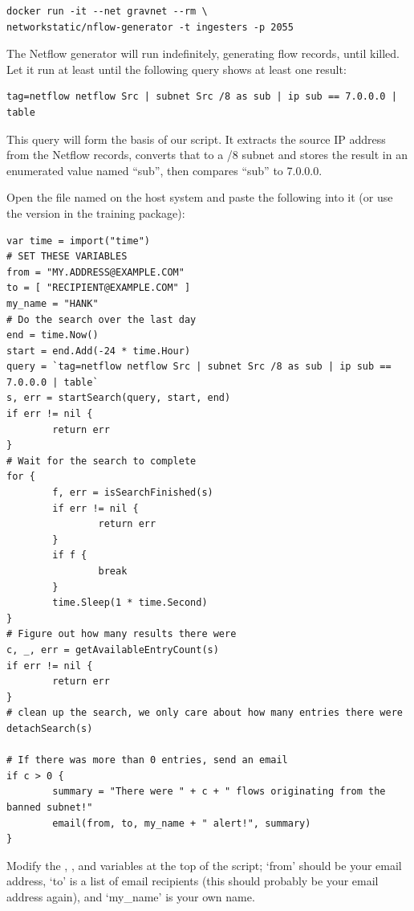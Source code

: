 \begin{Verbatim}[breaklines=true]
docker run -it --net gravnet --rm \
networkstatic/nflow-generator -t ingesters -p 2055
\end{Verbatim}

The Netflow generator will run indefinitely, generating flow records,
until killed. Let it run at least until the following query shows at
least one result:

\begin{Verbatim}[breaklines=true]
tag=netflow netflow Src | subnet Src /8 as sub | ip sub == 7.0.0.0 | table
\end{Verbatim}

This query will form the basis of our script. It extracts the source IP
address from the Netflow records, converts that to a /8 subnet and
stores the result in an enumerated value named ``sub'', then compares
``sub'' to 7.0.0.0.

Open the file named   on the host system and paste
the following into it (or use the version in the training package):

\begin{Verbatim}[breaklines=true]
var time = import("time")
# SET THESE VARIABLES
from = "MY.ADDRESS@EXAMPLE.COM"
to = [ "RECIPIENT@EXAMPLE.COM" ]
my_name = "HANK"
# Do the search over the last day
end = time.Now()
start = end.Add(-24 * time.Hour)
query = `tag=netflow netflow Src | subnet Src /8 as sub | ip sub == 7.0.0.0 | table`
s, err = startSearch(query, start, end)
if err != nil {
        return err
}
# Wait for the search to complete
for {
        f, err = isSearchFinished(s)
        if err != nil {
                return err
        }
        if f {
                break
        }
        time.Sleep(1 * time.Second)
}
# Figure out how many results there were
c, _, err = getAvailableEntryCount(s)
if err != nil {
        return err
}
# clean up the search, we only care about how many entries there were
detachSearch(s)

# If there was more than 0 entries, send an email
if c > 0 {
        summary = "There were " + c + " flows originating from the banned subnet!"
        email(from, to, my_name + " alert!", summary)
}
\end{Verbatim}

Modify the , , and  variables at the
top of the script; `from' should be your email address, `to' is a list
of email recipients (this should probably be your email address again),
and `my\_name' is your own name.

